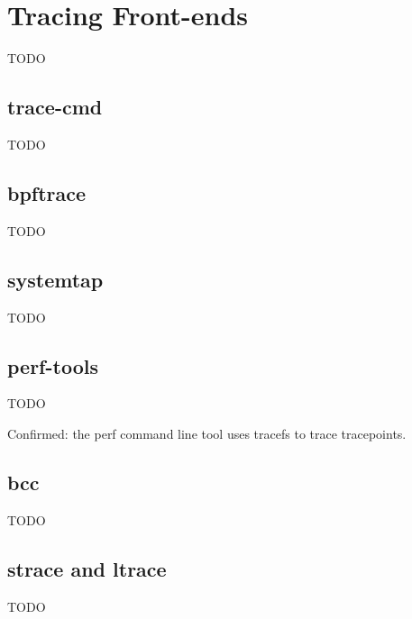 \section{Tracing Front-ends}

TODO

\subsection{trace-cmd}

TODO

\subsection{bpftrace}

TODO

\subsection{systemtap}

TODO

\subsection{perf-tools}

TODO

Confirmed: the perf command line tool uses tracefs to trace
tracepoints.

\subsection{bcc}

TODO

\subsection{strace and ltrace}

TODO
